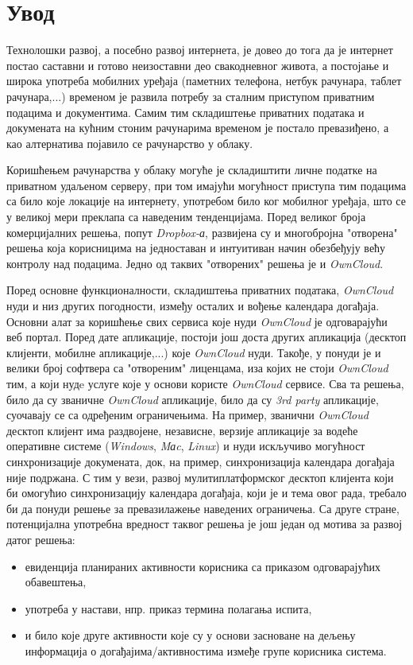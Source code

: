 \chapter{Увод}

Технолошки развој, а посебно развој интернета, је довео до тога да је интернет постао саставни и готово неизоставни део свакодневног живота, а постојање и широка употреба мобилних уређаја (паметних телефона, нетбук рачунара, таблет рачунара,...) временом је развила потребу за сталним приступом приватним подацима и документима. Самим тим складиштење приватних података и докумената на кућним стоним рачунарима временом је постало превазиђено, а као алтернатива појавило се рачунарство у облаку.

Коришћењем рачунарства у облаку могуће је складиштити личне податке на приватном удаљеном серверу, при том имајући могућност приступа тим подацима са било које локације на интернету, употребом било ког мобилног уређаја, што се у великој мери преклапа са наведеним тенденцијама. Поред великог броја комерцијалних решења, попут \textit{Dropbox-а}, развијена су и многобројна "отворена" решења која корисницима на једноставан и интуитиван начин обезбеђују већу контролу над подацима. Једно од таквих "отворених" решења је и \textit{OwnCloud}. 

Поред основне функционалности, складиштења приватних података, \textit{OwnCloud} нуди и низ других погодности, између осталих и вођење календара догађаја. Основни алат за коришћење свих сервиса које нуди \textit{OwnCloud} је одговарајући веб портал. Поред дате апликације, постоји још доста других апликација (десктоп клијенти, мобилне апликације,...) које \textit{OwnCloud} нуди. Такође, у понуди је и велики број софтвера са "отвореним" лиценцама, иза којих не стоји \textit{OwnCloud} тим, а који нудe услуге које у основи користе \textit{OwnCloud} сервисе. Сва та решења, било да су званичне \textit{OwnCloud} апликације, било да су \textit{3rd party} апликације, суочавају се са одређеним ограничењима. На пример, званични \textit{OwnCloud} десктоп клијент има раздвојене, независне, верзије апликације за водеће оперативне системе (\textit{Windows}, \textit{Mаc}, \textit{Linux}) и нуди искључиво могућност синхронизације докумената, док, на пример, синхронизација календара догађаја није подржана. 
С тим у вези,  развој мулитиплатформског десктоп клијента који би омогућио синхронизацију календара догађаја, који је и тема овог рада, требало би да понуди решење за превазилажење наведених ограничења. Са друге стране, потенцијална употребна вредност таквог решења је још један од мотива за развој датог решења:
\begin{itemize}
	\item{евиденција планираних активности корисника са приказом одговарајућих обавештења},
	\item{употреба у настави, нпр. приказ термина полагања испита},
	\item{и било које друге активности које су у основи засноване на дељењу информација о догађајима/активностима измеђе групе корисника система}.
\end{itemize}

